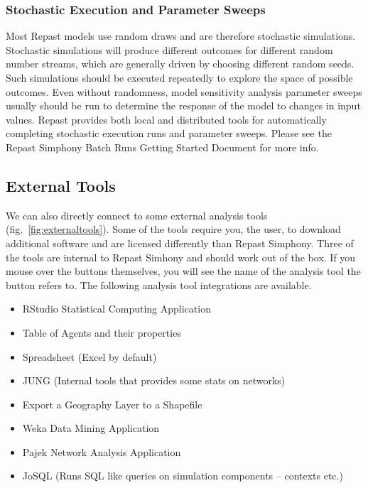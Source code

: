 \documentclass[11pt]{amsart}
\begin{document}
\subsubsection{Stochastic Execution and Parameter Sweeps}

Most Repast models use random draws and are therefore stochastic simulations. Stochastic simulations will produce different outcomes for different random number streams, which are generally driven by choosing different random seeds. Such simulations should be executed repeatedly to explore the space of possible outcomes. Even without randomness, model sensitivity analysis parameter sweeps usually should be run to determine the response of the model to changes in input values. Repast provides both local and distributed tools for automatically completing stochastic execution runs and parameter sweeps. Please see the Repast Simphony Batch Runs Getting Started Document for more info.

\subsection{External Tools}

We can also directly connect to some external analysis tools (fig.~\ref{fig:externaltools}). Some of the tools require you, the user, to download additional software and are licensed differently than Repast Simphony. Three of the tools are internal to Repast Simhony and should work out of the box. If you mouse over the buttons themselves, you will see the name of the analysis tool the button refers to. The following analysis tool integrations are available.

\vspace{.2in}
\begin{itemize}
\item RStudio Statistical Computing Application
\item Table of Agents and their properties
\item Spreadsheet (Excel by default)
\item JUNG (Internal tools that provides some stats on networks)
\item Export a Geography Layer to a Shapefile
\item Weka Data Mining Application
\item Pajek Network Analysis Application
\item JoSQL (Runs SQL like queries on simulation components -- contexts etc.)
\end{itemize}
\vspace{.2in}
\end{document}
